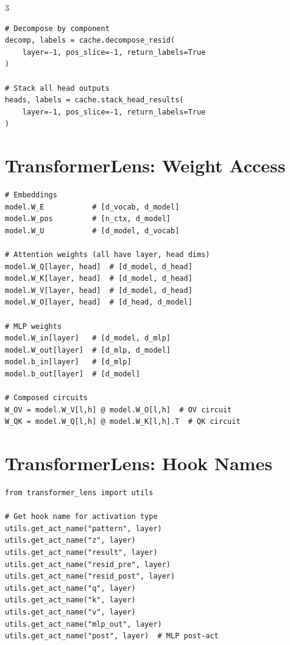\documentclass[10pt,a4paper,landscape]{article}
\begin{document}
\begin{multicols}{3}
\begin{lstlisting}
# Decompose by component
decomp, labels = cache.decompose_resid(
    layer=-1, pos_slice=-1, return_labels=True
)

# Stack all head outputs
heads, labels = cache.stack_head_results(
    layer=-1, pos_slice=-1, return_labels=True
)
\end{lstlisting}

\section{TransformerLens: Weight Access}

\begin{lstlisting}
# Embeddings
model.W_E           # [d_vocab, d_model]
model.W_pos         # [n_ctx, d_model]
model.W_U           # [d_model, d_vocab]

# Attention weights (all have layer, head dims)
model.W_Q[layer, head]  # [d_model, d_head]
model.W_K[layer, head]  # [d_model, d_head]
model.W_V[layer, head]  # [d_model, d_head]
model.W_O[layer, head]  # [d_head, d_model]

# MLP weights
model.W_in[layer]   # [d_model, d_mlp]
model.W_out[layer]  # [d_mlp, d_model]
model.b_in[layer]   # [d_mlp]
model.b_out[layer]  # [d_model]

# Composed circuits
W_OV = model.W_V[l,h] @ model.W_O[l,h]  # OV circuit
W_QK = model.W_Q[l,h] @ model.W_K[l,h].T  # QK circuit
\end{lstlisting}

\section{TransformerLens: Hook Names}

\begin{lstlisting}
from transformer_lens import utils

# Get hook name for activation type
utils.get_act_name("pattern", layer)
utils.get_act_name("z", layer)
utils.get_act_name("result", layer)
utils.get_act_name("resid_pre", layer)
utils.get_act_name("resid_post", layer)
utils.get_act_name("q", layer)
utils.get_act_name("k", layer)
utils.get_act_name("v", layer)
utils.get_act_name("mlp_out", layer)
utils.get_act_name("post", layer)  # MLP post-act


\end{lstlisting}
\end{multicols}
\end{document}
